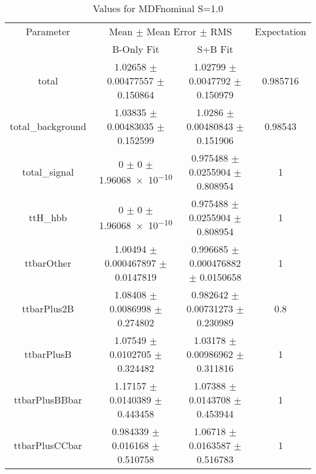 \begin{table}
\centering
\caption{Values for MDFnominal S=1.0}
\begin{tabular}{cccc}
\toprule
Parameter & \multicolumn{2}{c}{Mean $\pm$ Mean Error $\pm$ RMS} & Expectation\\
 & B-Only Fit & S+B Fit & \\
\midrule
total & \num{1.02658} $\pm$ \num{0.00477557} $\pm$ \num{0.150864} & \num{1.02799} $\pm$ \num{0.0047792} $\pm$ \num{0.150979} & \num{0.985716}\\
total\_background & \num{1.03835} $\pm$ \num{0.00483035} $\pm$ \num{0.152599} & \num{1.0286} $\pm$ \num{0.00480843} $\pm$ \num{0.151906} & \num{0.98543}\\
total\_signal & \num{0} $\pm$ \num{0} $\pm$ \num{1.96068e-10} & \num{0.975488} $\pm$ \num{0.0255904} $\pm$ \num{0.808954} & \num{1}\\
ttH\_hbb & \num{0} $\pm$ \num{0} $\pm$ \num{1.96068e-10} & \num{0.975488} $\pm$ \num{0.0255904} $\pm$ \num{0.808954} & \num{1}\\
ttbarOther & \num{1.00494} $\pm$ \num{0.000467897} $\pm$ \num{0.0147819} & \num{0.996685} $\pm$ \num{0.000476882} $\pm$ \num{0.0150658} & \num{1}\\
ttbarPlus2B & \num{1.08408} $\pm$ \num{0.0086998} $\pm$ \num{0.274802} & \num{0.982642} $\pm$ \num{0.00731273} $\pm$ \num{0.230989} & \num{0.8}\\
ttbarPlusB & \num{1.07549} $\pm$ \num{0.0102705} $\pm$ \num{0.324482} & \num{1.03178} $\pm$ \num{0.00986962} $\pm$ \num{0.311816} & \num{1}\\
ttbarPlusBBbar & \num{1.17157} $\pm$ \num{0.0140389} $\pm$ \num{0.443458} & \num{1.07388} $\pm$ \num{0.0143708} $\pm$ \num{0.453944} & \num{1}\\
ttbarPlusCCbar & \num{0.984339} $\pm$ \num{0.016168} $\pm$ \num{0.510758} & \num{1.06718} $\pm$ \num{0.0163587} $\pm$ \num{0.516783} & \num{1}\\
\bottomrule
\end{tabular}
\end{table}